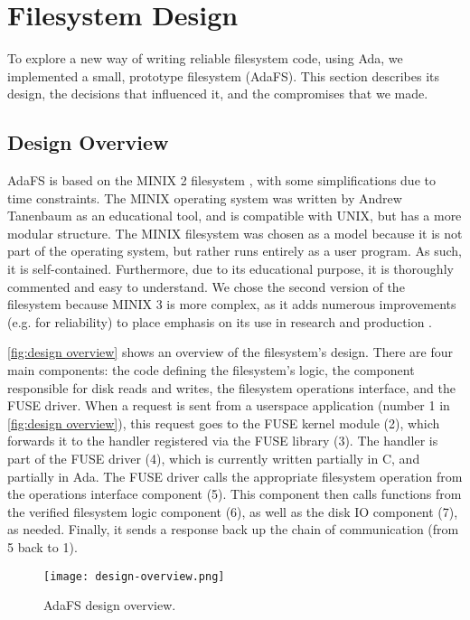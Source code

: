 \section{Filesystem Design}
To explore a new way of writing reliable filesystem code, using Ada, we implemented a small, prototype filesystem (AdaFS).
This section describes its design, the decisions that influenced it, and the compromises that we made.

\subsection{Design Overview}
AdaFS is based on the MINIX 2 filesystem \cite{tanenbaum1997}, with some simplifications due to time constraints.
The MINIX operating system was written by Andrew Tanenbaum as an educational tool, and is compatible with UNIX, but has a more modular structure.
The MINIX filesystem was chosen as a model because it is not part of the operating system, but rather runs entirely as a user program.
As such, it is self-contained.
Furthermore, due to its educational purpose, it is thoroughly commented and easy to understand.
We chose the second version of the filesystem because MINIX 3 is more complex, as it adds numerous improvements (e.g. for reliability) to place emphasis on its use in research and production \cite{minix3history}.

\autoref{fig:design overview} shows an overview of the filesystem's design.
There are four main components: the code defining the filesystem's logic, the component responsible for disk reads and writes, the filesystem operations interface, and the FUSE driver.
When a request is sent from a userspace application (number 1 in \autoref{fig:design overview}), this request goes to the FUSE kernel module (2), which forwards it to the handler registered via the FUSE library (3).
The handler is part of the FUSE driver (4), which is currently written partially in C, and partially in Ada.
The FUSE driver calls the appropriate filesystem operation from the operations interface component (5).
This component then calls functions from the verified filesystem logic component (6), as well as the disk IO component (7), as needed.
Finally, it sends a response back up the chain of communication (from 5 back to 1).

\begin{figure}[tb]
  \centering
  \texttt{[image: design-overview.png]}
  \caption{AdaFS design overview.}
  \label{fig:design overview}
\end{figure}



